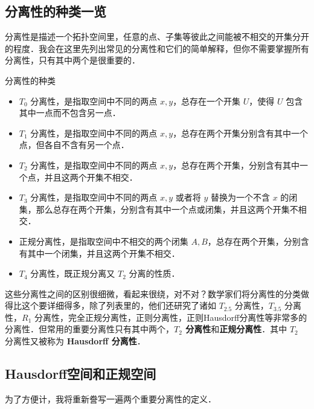 

\subsection{分离性的种类一览}

分离性是描述一个拓扑空间里，任意的点、子集等彼此之间能被不相交的开集分开的程度．我会在这里先列出常见的分离性和它们的简单解释，但你不需要掌握所有分离性，只有其中两个是很重要的．

\begin{definition}{分离性的种类}\label{Topo5_def1}
\begin{itemize}

\item $T_0$ 分离性，是指取空间中不同的两点 $x,y$，总存在一个开集 $U$，使得 $U$ 包含其中一点而不包含另一点．
\item $T_1$ 分离性，是指取空间中不同的两点 $x,y$，总存在两个开集分别含有其中一个点，但各自不含有另一个点．
\item $T_2$ 分离性，是指取空间中不同的两点 $x,y$，总存在两个开集，分别含有其中一个点，并且这两个开集不相交．
\item $T_3$ 分离性，是指取空间中不同的两点 $x,y$ 或者将 $y$ 替换为一个不含 $x$ 的闭集，那么总存在两个开集，分别含有其中一个点或闭集，并且这两个开集不相交．
\item 正规分离性，是指取空间中不相交的两个闭集 $A, B$，总存在两个开集，分别含有其中一个闭集，并且这两个开集不相交．
\item $T_4$ 分离性，既正规分离又 $T_2$ 分离的性质．


\end{itemize}
\end{definition}

这些分离性之间的区别很细微，看起来很绕，对不对？数学家们将分离性的分类做得比这个要详细得多，除了列表里的，他们还研究了诸如 $T_{2.5}$ 分离性，$T_{3.5}$ 分离性，$R_1$ 分离性，完全正规分离性，正则分离性，正则Hausdorff分离性等非常多的分离性．但常用的重要分离性只有其中两个，\textbf{$T_2$ 分离性}和\textbf{正规分离性}．其中 $T_2$ 分离性又被称为 \textbf{Hausdorff 分离性}．

\subsection{Hausdorff空间和正规空间}

为了方便计，我将重新誊写一遍两个重要分离性的定义．

